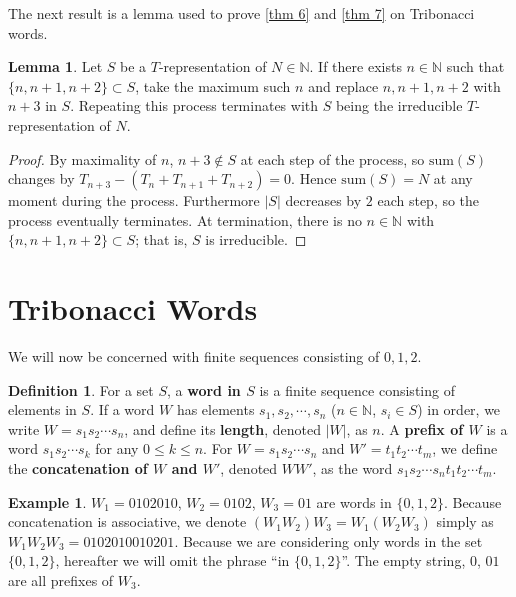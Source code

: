 \documentclass{article}
\theoremstyle{definition}
\newtheorem{lemma}[theorem]{Lemma}
\newtheorem*{definition}{Definition}
\newtheorem*{example}{Example}
\begin{document}
The next result is a lemma used to prove \cref{thm 6} and \cref{thm 7} on Tribonacci words.

\begin{lemma}
\label{thm 2}
Let \( S \) be a \( T \)-representation of \( N \in \mathbb{N} \).  
If there exists \( n \in \mathbb{N} \) such that \( \{n, n+1, n+2\} \subset S \), take the maximum such $n$ and replace $ n, n+1, n+2  $ with \( n+3 \) in \( S \).  
Repeating this process terminates with \( S \) being the irreducible \( T \)-representation of \( N \).
\end{lemma}

\begin{proof}
By maximality of $n$, $n+3\notin S$ at each step of the process, so $\text{sum}(S)$ changes by $T_{n+3}-(T_n+T_{n+1}+T_{n+2})=0$. Hence $\text{sum}(S)=N$ at any moment during the process. Furthermore $|S|$ decreases by $2$ each step, so the process eventually terminates. At termination, there is no $n\in\mathbb{N}$ with $\{n,n+1,n+2\}\subset S$; that is, $S$ is irreducible.
\end{proof}

\section{Tribonacci Words}
\label{sec2}

We will now be concerned with finite sequences consisting of $0, 1, 2$.
\begin{definition}
For a set $S$, a \textbf{word in $S$} is a finite sequence consisting of elements in $S$. If a word $W$ has elements $s_1, s_2, \cdots, s_n$ ($n\in \mathbb{N}$, $s_i\in S$) in order, we write  $W=s_1s_2\cdots s_n$, and define its \textbf{length}, denoted $|W|$, as $n$. A \textbf{prefix of $W$} is a word $s_1s_2\cdots s_k$ for any $0\leq k\leq n$. For $W=s_1s_2\cdots s_n$ and $W'=t_1t_2\cdots t_m$, we define the \textbf{concatenation of $W$ and $W'$}, denoted $WW'$, as the word $s_1s_2\cdots s_nt_1t_2\cdots t_m$.
\end{definition}

\begin{example}
$W_1=0102010$, $W_2=0102$, $W_3=01$ are words in $\{0,1,2\}$. Because concatenation is associative, we denote $(W_1W_2)W_3=W_1(W_2W_3)$ simply as $W_1W_2W_3=0102010010201$. Because we are considering only words in the set $\{0,1,2\}$, hereafter we will omit the phrase ``in $\{0,1,2\}$''. The empty string, $0$, $01$ are all prefixes of $W_3$.
\end{example}
\end{document}
